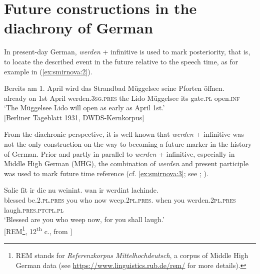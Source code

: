 \documentclass[output=paper,colorlinks,citecolor=brown]{langscibook}
\begin{document}
\section{Future constructions in the diachrony of German} \label{sec:smirnova:2}
In present-day German, \emph{werden} + infinitive is used to mark posteriority, that is, to locate the described event in the future relative to the speech time, as for example in (\ref{ex:smirnova:2}). 

\ea \label{ex:smirnova:2}
\gll Bereits am 1. April wird das Strandbad Müggelsee seine Pforten öffnen.\\
     already on 1st April werden.\textsc{3sg}.\textsc{pres} the Lido Müggelsee its gate.\textsc{pl} open.\textsc{inf}\\
\glt `The Müggelsee Lido will open as early as April 1st.'\\
\hfill [Berliner Tageblatt 1931, DWDS-Kernkorpus]
\z

From the diachronic perspective, it is well known that \emph{werden} + infinitive was not the only construction on the way to becoming a future marker in the history of German. Prior and partly in parallel to \emph{werden} + infinitive, especially in Middle High German (MHG), the combination of \emph{werden} and present participle was used to mark future time reference (cf. \ref{ex:smirnova:3}; see \cite{Hartmann2021}; \cite{Ihden2023}).

\ea \label{ex:smirnova:3}
\gll Salic ſit ir die nu weinint. wan ir werdint lachinde. \\ 
     blessed be.\textsc{2.pl.pres} you who now weep.\textsc{2pl}.\textsc{pres}. when you werden.\textsc{2pl}.\textsc{pres} laugh.\textsc{pres.ptcpl.pl}\\
\glt `Blessed are you who weep now, for you shall laugh.'\\
\hfill [REM\footnote{REM stands for \emph{Referenzkorpus Mittelhochdeutsch}, a corpus of Middle High German data (see \url{https://www.linguistics.rub.de/rem/} for more details).}, 12\textsuperscript{th} c., from \citet[367]{Hartmann2021}]
\z
\end{document}
